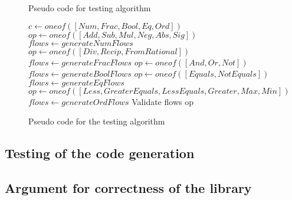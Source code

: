 \begin{figure}[h]
  \begin{algorithm}[H]
    \caption{Pseudo code for testing algorithm}
    \begin{algorithmic}
      \State $c\gets oneof([Num, Frac, Bool, Eq, Ord])$
          \State $op\gets oneof([Add, Sub, Mul, Neg, Abs, Sig])$
          \State $flows\gets generateNumFlows$
      \EndIf        
          \State $op\gets oneof([Div, Recip, FromRational])$
          \State $flows\gets generateFracFlows$
      \EndIf
          \State $op\gets oneof([And, Or, Not])$
          \State $flows\gets generateBoolFlows$
      \EndIf
          \State $op\gets oneof([Equals, NotEquals])$
          \State $flows\gets generateEqFlows$
      \EndIf
          \State $op\gets oneof([Less, GreaterEquals, LessEquals, Greater, Max, Min])$
          \State $flows\gets generateOrdFlows$
      \EndIf
      \State
      \State
      \Return Validate flows op
    \end{algorithmic}
  \end{algorithm}
  \caption{Pseudo code for the testing algorithm}
  \label{fig:testing}
\end{figure}

\subsection{Testing of the code generation}

\subsection{Argument for correctness of the library}

